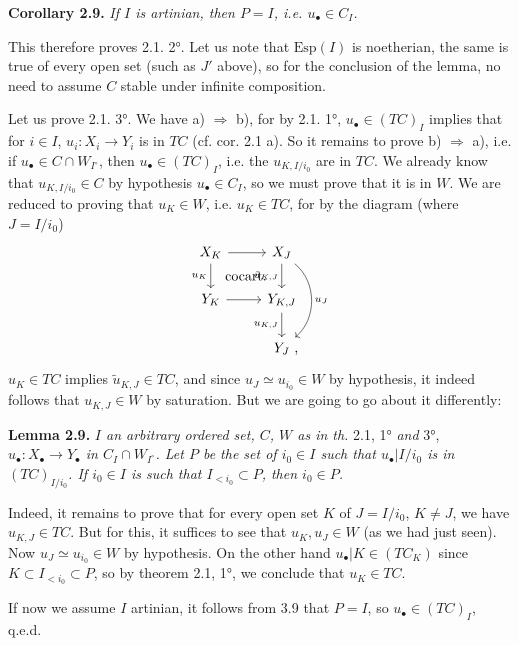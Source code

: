 \documentclass[11pt]{article}
\newcommand{\printedpage}[1]{\marginpar{\footnotesize p.~#1}}
\newcommand{\msp}[1]{\marginpar{\footnotesize [#1]}}
\begin{document}
\noindent\textbf{Corollary 2.9.} \textit{If $I$ is artinian, then $P = I$, i.e. $u_\bullet \in C_I$.}

This therefore proves 2.1. 2°. Let us note that $\mathrm{Esp}(I)$ is noetherian, the same is true of every open set (such as $J'$ above), so \msp{36} for the conclusion of the lemma, no need to assume $C$ stable under infinite composition.

\printedpage{20}

Let us prove 2.1. 3°. We have a) $\Longrightarrow$ b), for by 2.1. 1°, $u_\bullet \in (TC)_I$ implies that for $i \in I$, $u_i : X_i \longrightarrow Y_i$ is in $TC$ (cf. cor. 2.1 a). So it remains to prove b) $\Longrightarrow$ a), i.e. if $u_\bullet \in C \cap W_{I^\circ}$, then $u_\bullet \in (TC)_I$, i.e. the $u_{K,I/i_0}$ are in $TC$. We already know that $u_{K,I/i_0} \in C$ by hypothesis $u_\bullet \in C_I$, so we must prove that it is in $W$. We are reduced to proving that $u_K \in W$, i.e. $u_K \in TC$, for by the diagram (where $J = I/i_0$)
\[
\begin{tikzcd}
X_K \arrow[r] \arrow[d, "u_K"'] \arrow[dr, phantom, "\text{cocart.}"] & X_J \arrow[d, "\tilde{u}_{K,J}"'] \arrow[dd, bend left=50, "u_J"] \\
Y_K \arrow[r] & Y_{K,J} \arrow[d, "u_{K,J}"'] \\
& Y_J \rlap{\ ,}
\end{tikzcd}
\]
$u_K \in TC$ implies $\tilde{u}_{K,J} \in TC$, and since $u_J \simeq u_{i_0} \in W$ by hypothesis, it indeed follows that $u_{K,J} \in W$ by saturation. But we are going to go about it differently:

\msp{37}

\noindent\textbf{Lemma 2.9.} \textit{$I$ an arbitrary ordered set, $C$, $W$ as in th.} 2.1, 1° \textit{and} 3°, \textit{$u_\bullet : X_\bullet \longrightarrow Y_\bullet$ in $C_I \cap W_{I^\circ}$. Let $P$ be the set of $i_0 \in I$ such that $u_\bullet|I/i_0$ is in $(TC)_{I/i_0}$. If $i_0 \in I$ is such that $I_{<i_0} \subset P$, then $i_0 \in P$.}

Indeed, it remains to prove that for every open set $K$ of $J = I/i_0$, $K \neq J$, we have $u_{K,J} \in TC$. But for this, it suffices to see that $u_K, u_J \in W$ (as we had just seen). Now $u_J \simeq u_{i_0} \in W$ by hypothesis. On the other hand $u_\bullet|K \in (TC_K)$ since $K \subset I_{<i_0} \subset P$, so by theorem 2.1, 1°, we conclude that $u_K \in TC$.

If now we assume $I$ artinian, it follows from 3.9 that $P = I$, so $u_\bullet \in (TC)_I$, q.e.d. %
\end{document}
